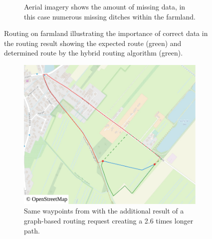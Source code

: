 \begin{figure}[h!]
\begin{minipage}[t]{.48\textwidth}
\begin{subfigure}[t]{\linewidth}
						\caption{Aerial imagery shows the amount of missing data, in this case numerous missing ditches within the farmland.}
						\label{fig:eval-rural-routing-6-aerial}
					\end{subfigure}
				\end{minipage}
				\caption[Illustration of routing problems and different weight-function values.]{Routing on farmland illustrating the importance of correct data in the routing result showing the expected route (green) and determined route by the hybrid routing algorithm (green).}
				\label{fig:eval-rural-routing-6}
			\end{figure}
			
			\begin{figure}[h!]
				\begin{minipage}[t]{.48\textwidth}
					\begin{subfigure}[t]{\linewidth}
						\includegraphics[width=\textwidth]{images/qgis-routing-rural-routing-6-graph-based}
						\caption{Same waypoints from  with the additional result of a graph-based routing request creating a 2.6 times longer path.}
						\label{fig:eval-rural-graph-based-comparison-6}
					\end{subfigure}
				\end{minipage}
				\hfill
				\begin{minipage}[t]{.48\textwidth}
					\begin{subfigure}[t]{\linewidth}

\end{subfigure}
\end{minipage}
\end{figure}
